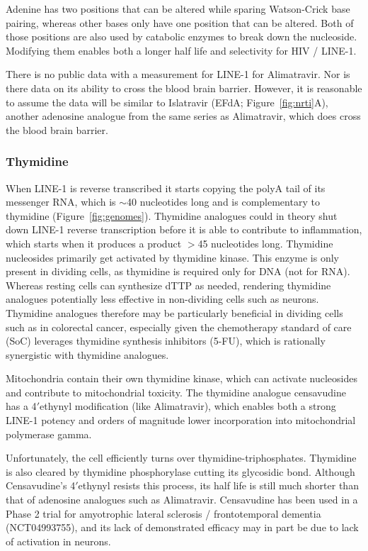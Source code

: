 \documentclass[11pt,twocolumn,twoside]{extarticle}
\begin{document}
Adenine has two positions that can be altered while sparing Watson-Crick base pairing, whereas other bases only have one position that can be altered. Both of those positions are also used by catabolic enzymes to break down the nucleoside. Modifying them enables both a longer half life and selectivity for HIV / LINE-1.

There is no public data with a measurement for LINE-1 for Alimatravir. Nor is there data on its ability to cross the blood brain barrier. However, it is reasonable to assume the data will be similar to Islatravir (EFdA; Figure~\ref{fig:nrti}A), another adenosine analogue from the same series as Alimatravir, which does cross the blood brain barrier\cite{gillespie}.

\subsubsection{Thymidine}
When LINE-1 is reverse transcribed it starts copying the polyA tail of its messenger RNA, which is $\sim$40 nucleotides long and is complementary to thymidine (Figure~\ref{fig:genomes}). Thymidine analogues could in theory shut down LINE-1 reverse transcription before it is able to contribute to inflammation, which starts when it produces a product $>$45 nucleotides long\cite{andreeva}. Thymidine nucleosides primarily get activated by thymidine kinase. This enzyme is only present in dividing cells, as thymidine is required only for DNA (not for RNA). Whereas resting cells can synthesize dTTP as needed, rendering thymidine analogues potentially less effective in non-dividing cells such as neurons\cite{sherley}. Thymidine analogues therefore may be particularly beneficial in dividing cells such as in colorectal cancer, especially given the chemotherapy standard of care (SoC) leverages thymidine synthesis inhibitors (5-FU), which is rationally synergistic with thymidine analogues.

Mitochondria contain their own thymidine kinase, which can activate nucleosides and contribute to mitochondrial toxicity\cite{arner}. The thymidine analogue censavudine has a 4$'$ethynyl modification (like Alimatravir), which enables both a strong LINE-1 potency and orders of magnitude lower incorporation into mitochondrial polymerase gamma\cite{gupta}.

Unfortunately, the cell efficiently turns over thymidine-triphosphates. Thymidine is also cleared by thymidine phosphorylase cutting its glycosidic bond. Although Censavudine's 4$'$ethynyl resists this process, its half life is still much shorter than that of adenosine analogues such as Alimatravir. Censavudine has been used in a Phase 2 trial for amyotrophic lateral sclerosis / frontotemporal dementia (NCT04993755), and its lack of demonstrated efficacy may in part be due to lack of activation in neurons.
\end{document}
